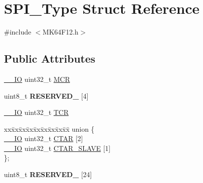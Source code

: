 \hypertarget{structSPI__Type}{}\section{S\+P\+I\+\_\+\+Type Struct Reference}
\label{structSPI__Type}


{\ttfamily \#include $<$M\+K64\+F12.\+h$>$}

\subsection*{Public Attributes}
\begin{DoxyCompactItemize}
\item 
\hyperlink{core__sc300_8h_aec43007d9998a0a0e01faede4133d6be}{\+\_\+\+\_\+\+IO} uint32\+\_\+t \hyperlink{structSPI__Type_a651ac70598a7c82ab57fc9eb672f3d70}{M\+CR}
\item 
uint8\+\_\+t {\bfseries R\+E\+S\+E\+R\+V\+E\+D\+\_} \mbox{[}4\mbox{]}\hypertarget{structSPI__Type_a4d7b2766488f717642c08706d93e4dd6}{}\label{structSPI__Type_a4d7b2766488f717642c08706d93e4dd6}

\item 
\hyperlink{core__sc300_8h_aec43007d9998a0a0e01faede4133d6be}{\+\_\+\+\_\+\+IO} uint32\+\_\+t \hyperlink{structSPI__Type_af7eab4d0bc295e978e3c0c28d7129481}{T\+CR}
\item 
\begin{tabbing}
xx\=xx\=xx\=xx\=xx\=xx\=xx\=xx\=xx\=\kill
union \{\\
\>\hyperlink{core__sc300_8h_aec43007d9998a0a0e01faede4133d6be}{\_\_IO} uint32\_t \hyperlink{structSPI__Type_a9bbdd6aba74a5acac2353d20f69cba9c}{CTAR} \mbox{[}2\mbox{]}\\
\>\hyperlink{core__sc300_8h_aec43007d9998a0a0e01faede4133d6be}{\_\_IO} uint32\_t \hyperlink{structSPI__Type_a201c3b1742bb0ed045008977151113fa}{CTAR\_SLAVE} \mbox{[}1\mbox{]}\\
\}; \hypertarget{structSPI__Type_ad766ce0a70f9095400ada915961d51e9}{}\label{structSPI__Type_ad766ce0a70f9095400ada915961d51e9}
\\

\end{tabbing}\item 
uint8\+\_\+t {\bfseries R\+E\+S\+E\+R\+V\+E\+D\+\_} \mbox{[}24\mbox{]}\hypertarget{structSPI__Type_a936c99e0be944bb0dac3e4ff123c8656}{}\label{structSPI__Type_a936c99e0be944bb0dac3e4ff123c8656}


\end{DoxyCompactItemize}

